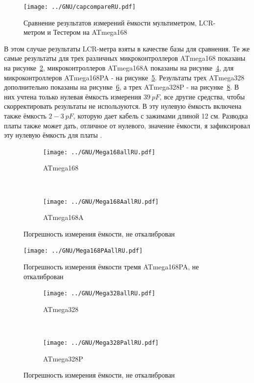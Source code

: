 \begin{figure}[H]
\centering
\texttt{[image: ../GNU/capcompareRU.pdf]}
\caption{Сравнение результатов измерений ёмкости мультиметром, LCR-метром и Тестером на ATmega168}
\label{fig:capcompare}
\end{figure}

В этом случае результаты LCR-метра взяты в качестве базы для сравнения. Те же самые результаты для трех различных 
микроконтроллеров ATmega168 показаны на рисунке~\ref{fig:mega168all}, микроконтроллеров ATmega168A показаны на 
рисунке~\ref{fig:mega168Aall}, для микроконтроллеров ATmega168PA - на рисунке~\ref{fig:mega168PAall}.
Результаты трех ATmega328 дополнительно показаны на рисунке~\ref{fig:mega328all}, а трех ATmega328P - на 
рисунке~\ref{fig:mega328Pall}.
В них учтена только нулевая ёмкость измерения \(39~pF\), все другие средства, чтобы скорректировать результаты 
не используются. В эту нулевую ёмкость включена также ёмкость \(2-3~pF\), которую дает кабель с зажимами длиной 12 см. 
Разводка платы также может дать, отличное от нулевого, значение ёмкости, я зафиксировал эту нулевую ёмкость для 
платы .

\begin{figure}[H]
  \begin{subfigure}[b]{.5\textwidth}
    \centering
    \texttt{[image: ../GNU/Mega168allRU.pdf]}
    \caption{ATmega168}
    \label{fig:mega168all}
  \end{subfigure}
  ~
  \begin{subfigure}[b]{.5\textwidth}
    \centering
    \texttt{[image: ../GNU/Mega168AallRU.pdf]}
    \caption{ATmega168A}
    \label{fig:mega168Aall}
  \end{subfigure}
\caption{Погрешность измерения ёмкости, не откалиброван}
\end{figure}

\begin{figure}[H]
\centering
\texttt{[image: ../GNU/Mega168PAallRU.pdf]}
\caption{Погрешность измерения ёмкости тремя ATmega168PA, не откалиброван}
\label{fig:mega168PAall}
\end{figure}

\begin{figure}[H]
  \begin{subfigure}[b]{.5\textwidth}
    \centering
    \texttt{[image: ../GNU/Mega328allRU.pdf]}
    \caption{ATmega328}
    \label{fig:mega328all}
  \end{subfigure}
  ~
  \begin{subfigure}[b]{.5\textwidth}
    \centering
    \texttt{[image: ../GNU/Mega328PallRU.pdf]}
    \caption{ATmega328P}
    \label{fig:mega328Pall}
  \end{subfigure}
\caption{Погрешность измерения ёмкости, не откалиброван}
\end{figure}

